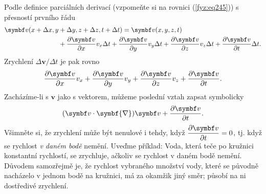 {    Podle definice parciálních derivací (vzpomeňte si na rovnici (\ref{fyz:eq245})) s přesností 
    prvního řádu
    \begin{align*}
      \bm{v}(x+ \Delta x, y 
        &+ \Delta y, z + \Delta z, t + \Delta t) 
         = \bm{v}(x, y, z, t)                                                                \\
        &+ \pder{\bm{v}}{x}v_x\Delta t + \pder{\bm{v}}{y}v_y\Delta t + \pder{\bm{v}}{z}v_z\Delta t
         + \pder{\bm{v}}{t}\Delta t.
    \end{align*}
    Zrychlení \(\Delta{\bm{v}}/\Delta{t}\) je pak rovno
    \begin{equation*}
      \pder{\bm{v}}{x}v_x + \pder{\bm{v}}{y}v_y + \pder{\bm{v}}{z}v_z + \pder{\bm{v}}{t}.
    \end{equation*}
    Zacházíme-li s \(\bm{v}\) jako s vektorem, můžeme poslední vztah zapsat symbolicky
    \begin{equation}\label{fyz:eq550}
      (\bm{v}\cdot\symbf{\nabla})\bm{v} + \pder{\bm{v}}{t}.
    \end{equation}
    Všimněte si, že zrychlení může být nenulové i tehdy, když \(\pder{\bm{v}}{t} = 0\), tj. když se 
    rychlost \emph{v daném bodě} nemění. Uveďme příklad: Voda, která teče po kružnici konstantní 
    rychlostí, se zrychluje, ačkoliv se rychlost v daném bodě nemění. Důvodem samozřejmě je, že 
    rychlost vybraného množství vody, které se původně nacházelo v jednom bodě na kružnici, má za 
    okamžik jiný směr; působí na ni dostředivé zrychlení. 
    
}
